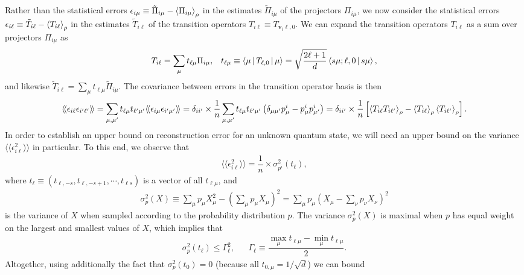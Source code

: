 \documentclass[notitlepage,twocolumn]{revtex4-2}
\newcommand{\f}[2]{\dfrac{#1}{#2}} %
\newcommand{\p}[1]{\left(#1\right)} %
\renewcommand{\sp}[1]{\left[#1\right]} %
\newcommand{\bk}{\Braket} %
\renewcommand{\v}{\bm} %
\newcommand{\bbk}[1]{\langle\!\langle #1 \rangle\!\rangle}
\begin{document}
Rather than the statistical errors $\epsilon_{i\mu} \equiv \tilde\Pi_{i\mu} - \bk{\Pi_{i\mu}}_\rho$ in the estimates $\tilde\Pi_{i\mu}$ of the projectors $\Pi_{i\mu}$, we now consider the statistical errors $\epsilon_{i\ell} \equiv \tilde T_{i\ell} - \bk{T_{i\ell}}_\rho$ in the estimates $\tilde T_{i\ell}$ of the transition operators $T_{i\ell} \equiv T_{\v v_i\ell,0}$.
We can expand the transition operators $T_{i\ell}$ as a sum over projectors $\Pi_{i\mu}$ as
\begin{align}
  T_{i\ell} = \sum_\mu t_{\ell\mu} \Pi_{i\mu},
  &&
  t_{\ell\mu} \equiv \bk{\mu|T_{\ell,0}|\mu}
  = \sqrt{\f{2\ell+1}{d}} \bk{s\mu;\ell,0|s\mu},
\end{align}
and likewise $\tilde T_{i\ell} = \sum_\mu t_{\ell\mu} \tilde\Pi_{i\mu}$.
The covariance between errors in the transition operator basis is then
\begin{align}
  \bbk{\epsilon_{i\ell} \epsilon_{i'\ell'}}
  = \sum_{\mu,\mu'} t_{\ell\mu} t_{\ell'\mu'}
  \bbk{\epsilon_{i\mu} \epsilon_{i'\mu'}}
  = \delta_{ii'} \times \f1n \sum_{\mu,\mu'} t_{\ell\mu} t_{\ell'\mu'}
  \p{\delta_{\mu\mu'} p_\mu^i - p_\mu^i p_{\mu'}^i}
  = \delta_{ii'} \times \f1n \sp{\bk{T_{i\ell} T_{i\ell'}}_\rho
    - \bk{T_{i\ell}}_\rho \bk{T_{i\ell'}}_\rho}.
\end{align}
In order to establish an upper bound on reconstruction error for an unknown quantum state, we will need an upper bound on the variance $\bbk{\epsilon_{i\ell}^2}$ in particular.
To this end, we observe that
\begin{align}
  \bbk{\epsilon_{i\ell}^2} = \f1n \times \sigma_{p^i}^2\p{t_\ell},
\end{align}
where $t_\ell \equiv \p{t_{\ell,-s},t_{\ell,-s+1},\cdots,t_{\ell s}}$ is a vector of all $t_{\ell\mu}$, and
\begin{align}
  \sigma_p^2\p{X}
  \equiv \sum_\mu p_\mu X_\mu^2 - \p{\sum_\mu p_\mu X_\mu}^2
  = \sum_\mu p_\mu \p{X_\mu - \sum_\nu p_\nu X_\nu}^2
\end{align}
is the variance of $X$ when sampled according to the probability distribution $p$.
The variance $\sigma_p^2\p{X}$ is maximal when $p$ has equal weight on the largest and smallest values of $X$, which implies that
\begin{align}
  \sigma_p^2\p{t_\ell} \le \Gamma_\ell^2,
  &&
  \Gamma_\ell \equiv \f{\max_\mu t_{\ell\mu} - \min_\mu t_{\ell\mu}}{2}.
\end{align}
Altogether, using additionally the fact that $\sigma_p^2\p{t_0}=0$ (because all $t_{0,\mu}=1/\sqrt{d}$) we can bound
\end{document}
